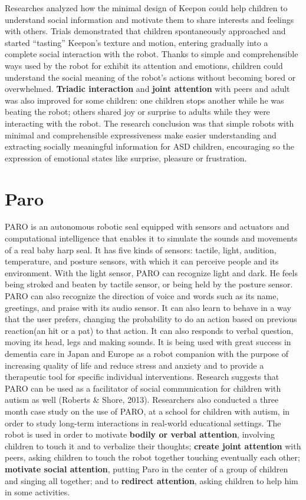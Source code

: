 Researches analyzed how the minimal design of Keepon could help children to understand social information and motivate them to share interests and feelings with others. Trials demonstrated that children spontaneously approached and started “tasting” Keepon's texture and motion, entering gradually into a complete social interaction with the robot. Thanks to simple and comprehensible ways used by the robot for exhibit its attention and emotions, children could understand the social meaning of the robot’s actions without becoming bored or overwhelmed. \textbf{Triadic interaction} and \textbf{joint attention} with peers and adult was also improved for some children: one children stops another while he was beating the robot; others shared joy or surprise to adults while they were interacting with the robot.
The research conclusion was that simple robots with  minimal and comprehensible expressiveness make easier understanding and extracting socially meaningful information for ASD children, encouraging so the expression of emotional states like surprise, pleasure or frustration.
\section{Paro}
PARO is an autonomous robotic seal equipped with sensors and actuators and computational intelligence that enables it to simulate the sounds and movements of a real baby harp seal. It has five kinds of sensors: tactile, light, audition, temperature, and posture sensors, with which it can perceive people and its environment. With the light sensor, PARO can recognize light and dark. He feels being stroked and beaten by tactile sensor, or being held by the posture sensor. PARO can also recognize the direction of voice and words such as its name, greetings, and praise with its audio sensor. It can also learn to behave in a way that the user prefers, changing the probability to do an action based on previous reaction(an hit or a pat) to that action. It can also responds to verbal question, moving its head, legs and making sounds. 
It is being used with great success in dementia care in Japan and Europe as a robot companion with the purpose of increasing quality of life and reduce stress and anxiety and to provide a therapeutic tool for specific individual interventions. Research suggests that PARO can be used as a facilitator of social communication for children with autism as well (Roberts \& Shore, 2013).
Researchers\cite{bertel2013peers} also conducted a three month case study on the use of PARO, at a school for children with autism, in order to study long-term interactions in real-world educational settings. The robot is used in order to motivate\textbf{ bodily or verbal attention}, involving children to touch it and to verbalize their thoughts; \textbf{create joint attention} with peers, asking children to touch the robot together touching eventually each other; \textbf{motivate social attention}, putting Paro in the center of a group of children and singing all together; and to \textbf{redirect attention}, asking children to help him in some activities.



